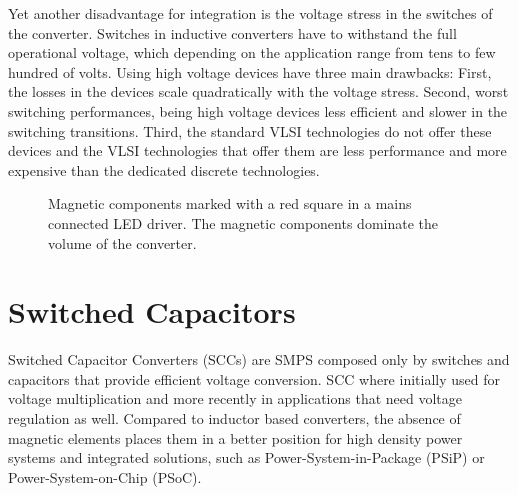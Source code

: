 Yet another disadvantage for integration is the voltage stress in the switches of the converter. Switches in inductive converters have to withstand the full operational voltage, which depending on the application range from tens to few hundred of volts. Using high voltage devices have three main drawbacks: First, the losses in the devices scale quadratically with the voltage  stress. Second, worst switching performances, being high voltage devices less efficient and slower in the switching transitions. Third, the standard VLSI technologies do not offer these devices and the VLSI technologies that offer them are less performance and more expensive than the dedicated discrete technologies.

\begin{figure}[!h]
\centering
{}
\caption{Magnetic components marked with a red square in a mains connected LED driver. The magnetic components dominate the volume of the converter.}
\label{fig:smps_driver}
\end{figure}


\section{Switched Capacitors}
Switched Capacitor Converters (SCCs) are SMPS composed only by switches and capacitors that provide efficient voltage conversion. SCC where initially used for voltage multiplication and more recently in applications that need voltage regulation as well. Compared to inductor based converters, the absence of magnetic elements places them in a better position for high density power systems and integrated solutions, such as Power-System-in-Package (PSiP) or Power-System-on-Chip (PSoC).


